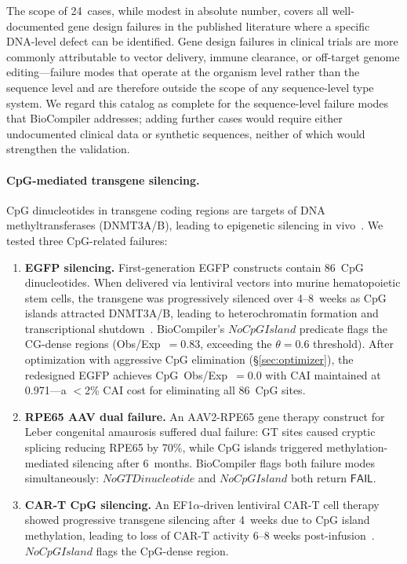 \documentclass[acmsmall,review,anonymous]{acmart}
\newcommand{\FAIL}{\ensuremath{\mathsf{FAIL}}\xspace}
\begin{document}
The scope of 24~cases, while modest in absolute number, covers all
well-documented gene design failures in the published literature where
a specific DNA-level defect can be identified.  Gene design failures
in clinical trials are more commonly attributable to vector delivery,
immune clearance, or off-target genome editing---failure modes that
operate at the organism level rather than the sequence level and are
therefore outside the scope of any sequence-level type system.  We
regard this catalog as complete for the sequence-level failure modes
that BioCompiler addresses; adding further cases would require either
undocumented clinical data or synthetic sequences, neither of which
would strengthen the validation.

\paragraph{CpG-mediated transgene silencing.}
CpG dinucleotides in transgene coding regions are targets of DNA
methyltransferases (DNMT3A/B), leading to epigenetic silencing in
vivo~\cite{bauer2010cpg,krinner2015cpg}.  We tested three CpG-related
failures:

\begin{enumerate}[leftmargin=*,itemsep=1pt,topsep=2pt]
\item \textbf{EGFP silencing.}  First-generation EGFP constructs contain
86~CpG dinucleotides.  When delivered via lentiviral vectors into murine
hematopoietic stem cells, the transgene was progressively silenced over
4--8~weeks as CpG islands attracted DNMT3A/B, leading to heterochromatin
formation and transcriptional shutdown~\cite{bauer2010cpg}.
BioCompiler's $\mathit{NoCpGIsland}$ predicate flags the CG-dense
regions (Obs/Exp~$= 0.83$, exceeding the $\theta = 0.6$ threshold).
After optimization with aggressive CpG elimination
(\S\ref{sec:optimizer}), the redesigned EGFP achieves CpG~Obs/Exp~$=
0.0$ with CAI maintained at 0.971---a $<$2\% CAI cost for eliminating
all 86~CpG sites.

\item \textbf{RPE65 AAV dual failure.}  An AAV2-RPE65 gene therapy
construct for Leber congenital amaurosis suffered dual failure: GT
sites caused cryptic splicing reducing RPE65 by 70\%, while CpG islands
triggered methylation-mediated silencing after 6~months.
BioCompiler flags both failure modes simultaneously:
$\mathit{NoGTDinucleotide}$ and $\mathit{NoCpGIsland}$ both return
\FAIL.

\item \textbf{CAR-T CpG silencing.}  An EF1$\alpha$-driven lentiviral
CAR-T cell therapy showed progressive transgene silencing after 4~weeks
due to CpG island methylation, leading to loss of CAR-T activity 6--8
weeks post-infusion~\cite{low2014cpg}.  $\mathit{NoCpGIsland}$ flags
the CpG-dense region.
\end{enumerate}
\end{document}

